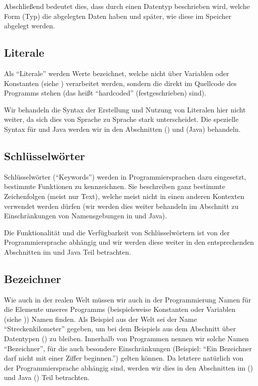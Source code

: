 	Abschließend bedeutet dies, dass durch einen Datentyp beschrieben wird, welche Form (Typ) die abgelegten Daten haben und später, wie diese im Speicher abgelegt werden.

\subsection{Literale} \functionalMark \imperativeMark \oopMark
	
	Als \enquote{Literale} werden Werte bezeichnet, welche nicht über Variablen oder Konstanten (siehe ) verarbeitet werden, sondern die direkt im Quellcode des Programms stehen (das heißt \enquote{hardcoded} (festgeschrieben) sind).
	
	Wir behandeln die Syntax der Erstellung und Nutzung von Literalen hier nicht weiter, da sich dies von Sprache zu Sprache stark unterscheidet. Die spezielle Syntax für \racket und Java werden wir in den Abschnitten  (\racket) und  (Java) behandeln.

\subsection{Schlüsselwörter} \functionalMark \imperativeMark \oopMark
	
	Schlüsselwörter (\enquote{Keywords}) werden in Programmiersprachen dazu eingesetzt, bestimmte Funktionen zu kennzeichnen. Sie beschreiben ganz bestimmte Zeichenfolgen (meist nur Text), welche meist nicht in einen anderen Kontexten verwendet werden dürfen (wir werden dies weiter behandeln im Abschnitt zu Einschränkungen von Namensgebungen in \racket und Java).
	
	Die Funktionalität und die Verfügbarkeit von Schlüsselwörtern ist von der Programmiersprache abhängig und wir werden diese weiter in den entsprechenden Abschnitten im \racket und Java Teil betrachten.

\subsection{Bezeichner} \functionalMark \imperativeMark \oopMark
	
	Wie auch in der realen Welt müssen wir auch in der Programmierung Namen für die Elemente unseres Programms (beispielsweise Konstanten oder Variablen (siehe )) Namen finden. Als Beispiel aus der Welt sei der Name \enquote{Streckenkilometer} gegeben, um bei dem Beispiels aus dem Abschnitt über Datentypen () zu bleiben. Innerhalb von Programmen nennen wir solche Namen \enquote{Bezeichner}, für die auch besondere Einschränkungen (Beispiel: \enquote{Ein Bezeichner darf nicht mit einer Ziffer beginnen.}) gelten können. Da letztere natürlich von der Programmiersprache abhängig sind, werden wir dies in den Abschnitten im \racket () und Java () Teil betrachten.

